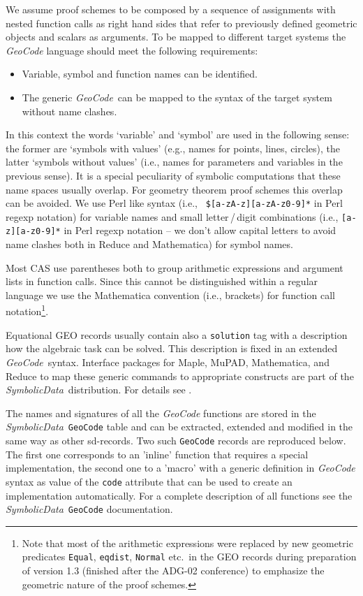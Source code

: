 \documentclass[11pt]{article}
\newcommand{\GC}{\textit{Geo\-Code}}
\newcommand{\SD}{\textit{Symbolic\-Data}}
\begin{document}
We assume proof schemes to be composed by a sequence of assignments with
nested function calls as right hand sides that refer to previously defined
geometric objects and scalars as arguments. To be mapped to different target
systems the {\GC} language should meet the following requirements:
\begin{itemize}\itemsep0pt
\item[(1)] Variable, symbol and function names can be identified.
\item[(2)] The generic \GC\ can be mapped to the syntax of the target system
  without name clashes.
\end{itemize}

In this context the words `variable' and `symbol' are used in the following
sense: the former are `symbols with values' (e.g., names for points, lines,
circles), the latter `symbols without values' (i.e., names for parameters and
variables in the previous sense). It is a special peculiarity of symbolic
computations that these name spaces usually overlap.  For geometry theorem
proof schemes this overlap can be avoided. We use Perl like syntax (i.e., {\tt
  \$[a-zA-z][a-zA-z0-9]*} in Perl regexp notation) for variable names
and small letter\,/\,digit combinations (i.e., {\tt [a-z][a-z0-9]*} in Perl
regexp notation -- we don't allow capital letters to avoid name clashes both
in Reduce and Mathematica) for symbol names.

Most CAS use parentheses both to group arithmetic expressions and argument
lists in function calls. Since this cannot be distinguished within a regular
language we use the Mathematica convention (i.e., brackets) for function call
notation\footnote{Note that most of the arithmetic expressions were replaced
  by new geometric predicates {\tt Equal}, {\tt eqdist}, {\tt Normal} etc.\ in
  the GEO records during preparation of version 1.3 (finished after the ADG-02
  conference) to emphasize the geometric nature of the proof schemes. }.

Equational GEO records usually contain also a {\tt solution} tag with a
description how the algebraic task can be solved. This description is fixed in
an extended \GC\ syntax. Interface packages for Maple, MuPAD, Mathematica, and
Reduce to map these generic commands to appropriate constructs are part of the
\SD\ distribution.  For details see \cite{rwca-02}.  \medskip

The names and signatures of all the {\GC} functions are stored in the \SD\ 
{\tt GeoCode} table and can be extracted, extended and modified in the same
way as other sd-records. Two such {\tt GeoCode} records are reproduced below.
The first one corresponds to an 'inline' function that requires a special
implementation, the second one to a 'macro' with a generic definition in {\GC}
syntax as value of the {\tt code} attribute that can be used to create an
implementation automatically. For a complete description of all functions see
the \SD\ {\tt GeoCode} documentation.
\end{document}
